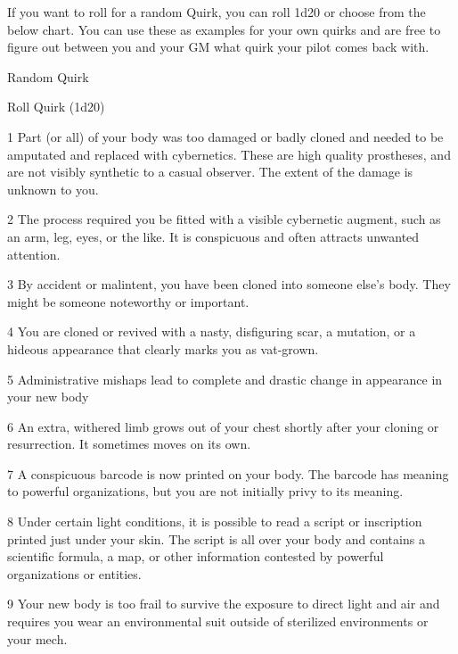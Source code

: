 If you want to roll for a random Quirk, you can roll 1d20 or choose from the below chart. You can  
use these as examples for your own quirks and are free to figure out between you and your GM  
what quirk your pilot comes back with.
 

                                                 Random Quirk
 

 Roll
      Quirk 
 (1d20) 

 1          Part (or all) of your body was too damaged or badly cloned and needed to be amputated and  
            replaced with cybernetics. These are high quality prostheses, and are not visibly synthetic to a  
            casual observer. The extent of the damage is unknown to you.  

                                                                                                                 


2          The process required you be fitted with a visible cybernetic augment, such as an arm, leg,  
           eyes, or the like. It is conspicuous and often attracts unwanted attention. 

3          By accident or malintent, you have been cloned into someone else’s body. They might be  
           someone noteworthy or important. 

4          You are cloned or revived with a nasty, disfiguring scar, a mutation, or a hideous appearance  
           that clearly marks you as vat-grown. 

5          Administrative mishaps lead to complete and drastic change in appearance in your new body 

6          An extra, withered limb grows out of your chest shortly after your cloning or resurrection. It  
           sometimes moves on its own. 

7          A conspicuous barcode is now printed on your body. The barcode has meaning to powerful  
           organizations, but you are not initially privy to its meaning. 

8          Under certain light conditions, it is possible to read a script or inscription printed just under  
           your skin. The script is all over your body and contains a scientific formula, a map, or other  
           information contested by powerful organizations or entities. 

9          Your new body is too frail to survive the exposure to direct light and air and requires you wear  
           an environmental suit outside of sterilized environments or your mech. 

